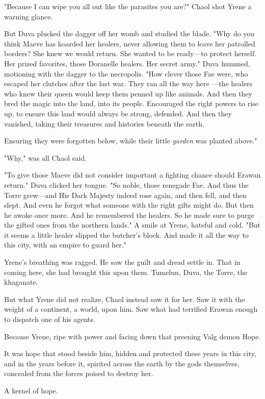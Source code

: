 "Because I can wipe you all out like the parasites you are?"
Chaol shot Yrene a warning glance.

But Duva plucked the dagger off her womb and studied the blade.
"Why do you think Maeve has hoarded her healers, never allowing them to leave her patrolled borders?
She knew we would return.
She wanted to be ready---to protect herself.
Her prized favorites, those Doranelle healers.
Her secret army."
Duva hummed, motioning with the dagger to the necropolis.
"How clever those Fae were, who escaped her clutches after the last war.
They ran all the way here ---the healers who knew their queen would keep them penned up like animals.
And then they bred the magic into the land, into its people.
Encouraged the right powers to rise up, to ensure this land would always be strong, defended.
And then they vanished, taking their treasures and histories beneath the earth.

Ensuring they were forgotten below, while their little \emph{garden} was planted above."

"Why," was all Chaol said.

"To give those Maeve did not consider important a fighting chance should Erawan return."
Duva clicked her tongue.
"So noble, those renegade Fae.
And thus the Torre grew---and His Dark Majesty indeed rose again, and then fell, and then slept.
And even he forgot what someone with the right gifts might do.
But then he awoke once more.
And he remembered the healers.
So he made sure to purge the gifted ones from the northern lands."
A smile at Yrene, hateful and cold.
"But it seems a little healer slipped the butcher's block.
And made it all the way to this city, with an empire to guard her."

Yrene's breathing was ragged.
He saw the guilt and dread settle in.
That in coming here, she had brought this upon them.
Tumelun, Duva, the Torre, the khaganate.

But what Yrene did not realize, Chaol instead saw it for her.
Saw it with the weight of a continent, a world, upon him.
Saw what had terrified Erawan enough to dispatch one of his agents.

Because Yrene, ripe with power and facing down that preening Valg demon  Hope.

It was hope that stood beside him, hidden and protected these years in this city, and in the years before it, spirited across the earth by the gods themselves, concealed from the forces poised to destroy her.

A kernel of hope.

